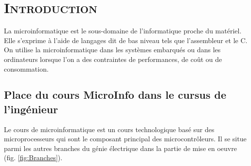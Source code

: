 
\chapter{\textsc{Introduction}}

\label{Chapter1} %



La microinformatique est le sous-domaine de l'informatique proche du matériel. Elle s'exprime à l'aide de langages dit de bas niveau tels que l'assembleur et le C. On utilise la microinformatique dans les systèmes embarqués ou dans les ordinateurs lorsque l'on a des contraintes de performances, de coût ou de consommation.

\section{Place du cours MicroInfo dans le cursus de l'ingénieur}

Le cours de microinformatique est un cours technologique basé sur des microprocesseurs qui sont le composant principal des microcontrôleurs.  Il se situe parmi les autres branches du génie électrique dans la partie de mise en oeuvre (fig. \ref{fig:Branches}).

